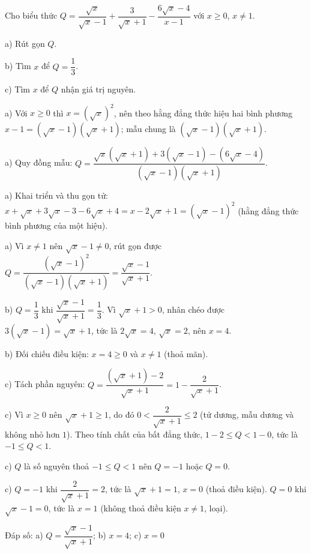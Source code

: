 \begin{problem}[9DS-CAN-010]
Cho biểu thức $Q = \dfrac{\sqrt{x}}{\sqrt{x} - 1} + \dfrac{3}{\sqrt{x} + 1} - \dfrac{6\sqrt{x} - 4}{x - 1}$ với $x \geq 0$, $x \neq 1$.

a) Rút gọn $Q$.

b) Tìm $x$ để $Q = \dfrac{1}{3}$.

c) Tìm $x$ để $Q$ nhận giá trị nguyên.

\begin{solution}
a) Với $x \geq 0$ thì $x = (\sqrt{x})^2$, nên theo hằng đẳng thức hiệu hai bình phương $x - 1 = (\sqrt{x} - 1)(\sqrt{x} + 1)$; mẫu chung là $(\sqrt{x} - 1)(\sqrt{x} + 1)$.

a) Quy đồng mẫu: $Q = \dfrac{\sqrt{x}(\sqrt{x} + 1) + 3(\sqrt{x} - 1) - (6\sqrt{x} - 4)}{(\sqrt{x} - 1)(\sqrt{x} + 1)}$.

a) Khai triển và thu gọn tử: $x + \sqrt{x} + 3\sqrt{x} - 3 - 6\sqrt{x} + 4 = x - 2\sqrt{x} + 1 = (\sqrt{x} - 1)^2$ (hằng đẳng thức bình phương của một hiệu).

a) Vì $x \neq 1$ nên $\sqrt{x} - 1 \neq 0$, rút gọn được $Q = \dfrac{(\sqrt{x} - 1)^2}{(\sqrt{x} - 1)(\sqrt{x} + 1)} = \dfrac{\sqrt{x} - 1}{\sqrt{x} + 1}$.

b) $Q = \dfrac{1}{3}$ khi $\dfrac{\sqrt{x} - 1}{\sqrt{x} + 1} = \dfrac{1}{3}$. Vì $\sqrt{x} + 1 > 0$, nhân chéo được $3(\sqrt{x} - 1) = \sqrt{x} + 1$, tức là $2\sqrt{x} = 4$, $\sqrt{x} = 2$, nên $x = 4$.

b) Đối chiếu điều kiện: $x = 4 \geq 0$ và $x \neq 1$ (thoả mãn).

c) Tách phần nguyên: $Q = \dfrac{(\sqrt{x} + 1) - 2}{\sqrt{x} + 1} = 1 - \dfrac{2}{\sqrt{x} + 1}$.

c) Vì $x \geq 0$ nên $\sqrt{x} + 1 \geq 1$, do đó $0 < \dfrac{2}{\sqrt{x} + 1} \leq 2$ (tử dương, mẫu dương và không nhỏ hơn $1$). Theo tính chất của bất đẳng thức, $1 - 2 \leq Q < 1 - 0$, tức là $-1 \leq Q < 1$.

c) $Q$ là số nguyên thoả $-1 \leq Q < 1$ nên $Q = -1$ hoặc $Q = 0$.

c) $Q = -1$ khi $\dfrac{2}{\sqrt{x} + 1} = 2$, tức là $\sqrt{x} + 1 = 1$, $x = 0$ (thoả điều kiện). $Q = 0$ khi $\sqrt{x} - 1 = 0$, tức là $x = 1$ (không thoả điều kiện $x \neq 1$, loại).

Đáp số: a) $\boxed{Q = \dfrac{\sqrt{x} - 1}{\sqrt{x} + 1}}$; b) $\boxed{x = 4}$; c) $\boxed{x = 0}$
\end{solution}
\end{problem}

